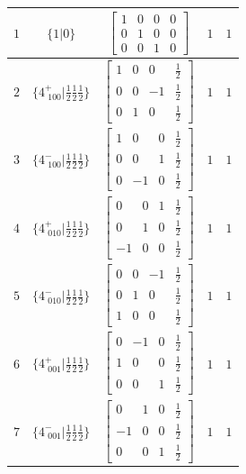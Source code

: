 \documentclass[fleqn,8pt]{jsarticle}
\begin{document}
\begin{longtable}{ccccc}
$ 1 $ & $ \{1|0\} $ & $ \begin{bmatrix} 1 & 0 & 0 & 0 \\ 0 & 1 & 0 & 0 \\ 0 & 0 & 1 & 0 \end{bmatrix} $ & $ 1 $ & $ 1 $ \\ \hline
$ 2 $ & $ \{4^{+}_{\,\,100}|\frac{1}{2} \frac{1}{2} \frac{1}{2}\} $ & $ \begin{bmatrix} 1 & 0 & 0 & \frac{1}{2} \\ 0 & 0 & -1 & \frac{1}{2} \\ 0 & 1 & 0 & \frac{1}{2} \end{bmatrix} $ & $ 1 $ & $ 1 $ \\ \hline
$ 3 $ & $ \{4^{-}_{\,\,100}|\frac{1}{2} \frac{1}{2} \frac{1}{2}\} $ & $ \begin{bmatrix} 1 & 0 & 0 & \frac{1}{2} \\ 0 & 0 & 1 & \frac{1}{2} \\ 0 & -1 & 0 & \frac{1}{2} \end{bmatrix} $ & $ 1 $ & $ 1 $ \\ \hline
$ 4 $ & $ \{4^{+}_{\,\,010}|\frac{1}{2} \frac{1}{2} \frac{1}{2}\} $ & $ \begin{bmatrix} 0 & 0 & 1 & \frac{1}{2} \\ 0 & 1 & 0 & \frac{1}{2} \\ -1 & 0 & 0 & \frac{1}{2} \end{bmatrix} $ & $ 1 $ & $ 1 $ \\ \hline
$ 5 $ & $ \{4^{-}_{\,\,010}|\frac{1}{2} \frac{1}{2} \frac{1}{2}\} $ & $ \begin{bmatrix} 0 & 0 & -1 & \frac{1}{2} \\ 0 & 1 & 0 & \frac{1}{2} \\ 1 & 0 & 0 & \frac{1}{2} \end{bmatrix} $ & $ 1 $ & $ 1 $ \\ \hline
$ 6 $ & $ \{4^{+}_{\,\,001}|\frac{1}{2} \frac{1}{2} \frac{1}{2}\} $ & $ \begin{bmatrix} 0 & -1 & 0 & \frac{1}{2} \\ 1 & 0 & 0 & \frac{1}{2} \\ 0 & 0 & 1 & \frac{1}{2} \end{bmatrix} $ & $ 1 $ & $ 1 $ \\ \hline
$ 7 $ & $ \{4^{-}_{\,\,001}|\frac{1}{2} \frac{1}{2} \frac{1}{2}\} $ & $ \begin{bmatrix} 0 & 1 & 0 & \frac{1}{2} \\ -1 & 0 & 0 & \frac{1}{2} \\ 0 & 0 & 1 & \frac{1}{2} \end{bmatrix} $ & $ 1 $ & $ 1 $ \\ \hline

\end{longtable}
\end{document}
